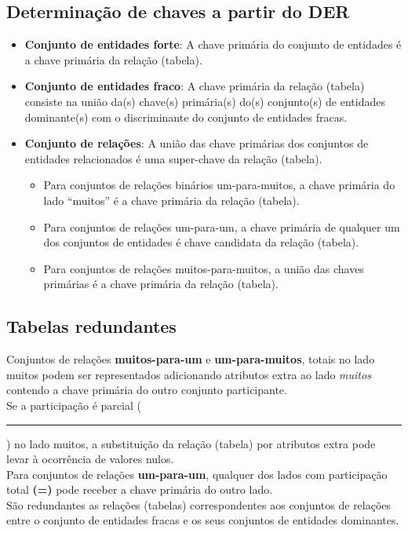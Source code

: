 \documentclass{article}
\newcommand*{\xdash}[1][3em]{\rule[0.5ex]{#1}{0.55pt}}
\begin{document}
\subsection{Determinação de chaves a partir do DER}
\begin{itemize}
  \item \textbf{Conjunto de entidades forte}: A chave primária do conjunto de entidades é a chave primária da relação (tabela).
  \item \textbf{Conjunto de entidades fraco}: A chave primária da relação (tabela) consiste na união da(s) chave(s) primária(s) do(s) conjunto(s) de entidades dominante(s) com o discriminante do conjunto de entidades fracas.
  \item \textbf{Conjunto de relações}: A união das chave primárias dos conjuntos de entidades relacionados é uma super-chave da relação (tabela).
        \begin{itemize}
          \item Para conjuntos de relações binários um-para-muitos, a chave primária do lado “muitos” é a chave primária da relação (tabela).
          \item Para conjuntos de relações um-para-um, a chave primária de qualquer um dos conjuntos de entidades é chave candidata da relação (tabela).
          \item Para conjuntos de relações muitos-para-muitos, a união das chaves primárias é a chave primária da relação (tabela).
        \end{itemize}
\end{itemize}

\subsection{Tabelas redundantes}
Conjuntos de relações \textbf{muitos-para-um} e \textbf{um-para-muitos}, totais no lado muitos podem ser representados adicionando atributos extra ao lado \textit{muitos} contendo a chave primária do outro conjunto participante. \\
Se a participação é parcial (\xdash[1em]) no lado muitos, a substituição da relação (tabela) por atributos extra pode levar à ocorrência de valores nulos.\\
Para conjuntos de relações \textbf{um-para-um}, qualquer dos lados com participação total \textbf{(=)} pode receber a chave primária do outro lado.\\
São redundantes as relações (tabelas) correspondentes aos conjuntos de relações entre o conjunto de entidades fracas e os seus conjuntos de entidades dominantes.
\end{document}
